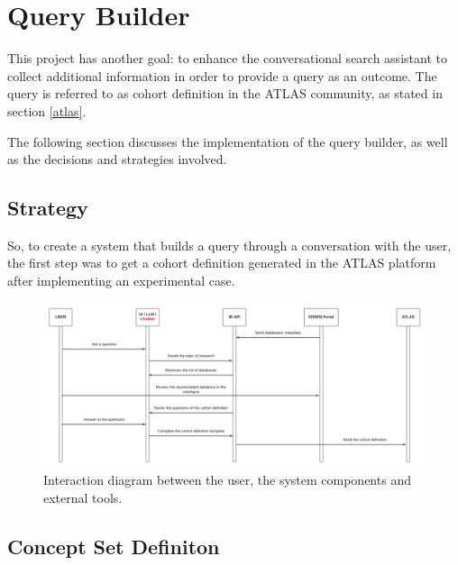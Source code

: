 \chapter{Query Builder}
\label{chapter:QueryBuilder}

This project has another goal: to enhance the conversational search assistant to collect additional information in order to provide a query as an outcome. The query is referred to as cohort definition in the ATLAS community, as stated in section \ref{atlas}.

The following section discusses the implementation of the query builder, as well as the decisions and strategies involved.


\section{Strategy}


So, to create a system that builds a query through a conversation with the user, the first step was to get a cohort definition generated in the ATLAS platform after implementing an experimental case.


\begin{figure}[H]
  \includegraphics[width=\textwidth]{figs/chapter4/interaction_diagram.png}
  \centering
  \caption{Interaction diagram between the user, the system components and external tools.}
  \label{fig_interaction}
\end{figure}



\section{Concept Set Definiton}



